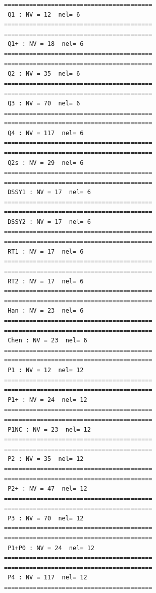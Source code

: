 \begin{tiny}
\begin{verbatim}
=========================================
 Q1 : NV = 12  nel= 6
=========================================
=========================================
 Q1+ : NV = 18  nel= 6
=========================================
=========================================
 Q2 : NV = 35  nel= 6
=========================================
=========================================
 Q3 : NV = 70  nel= 6
=========================================
=========================================
 Q4 : NV = 117  nel= 6
=========================================
=========================================
 Q2s : NV = 29  nel= 6
=========================================
=========================================
 DSSY1 : NV = 17  nel= 6
=========================================
=========================================
 DSSY2 : NV = 17  nel= 6
=========================================
=========================================
 RT1 : NV = 17  nel= 6
=========================================
=========================================
 RT2 : NV = 17  nel= 6
=========================================
=========================================
 Han : NV = 23  nel= 6
=========================================
=========================================
 Chen : NV = 23  nel= 6
=========================================
=========================================
 P1 : NV = 12  nel= 12
=========================================
=========================================
 P1+ : NV = 24  nel= 12
=========================================
=========================================
 P1NC : NV = 23  nel= 12
=========================================
=========================================
 P2 : NV = 35  nel= 12
=========================================
=========================================
 P2+ : NV = 47  nel= 12
=========================================
=========================================
 P3 : NV = 70  nel= 12
=========================================
=========================================
 P1+P0 : NV = 24  nel= 12
=========================================
=========================================
 P4 : NV = 117  nel= 12
=========================================
\end{verbatim}
\end{tiny}




\newpage
